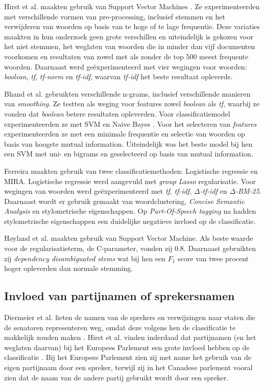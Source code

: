 Hirst et al. maakten  gebruik van Support Vector Machines \cite{Hirst_textto}. Ze experimenteerden met verschillende vormen van pre-processing, inclusief stemmen en het verwijderen van woorden op basis van te hoge of te lage frequentie. Deze variaties maakten in hun onderzoek geen grote verschillen en uiteindelijk is gekozen voor het niet stemmen, het weglaten van woorden die in minder dan vijf documenten voorkomen en resultaten van zowel met als zonder de top 500 meest frequente woorden. Daarnaast werd geëxperimenteerd met vier wegingen voor woorden: \textit{boolean}, \textit{tf}, \textit{tf-norm} en \textit{tf-idf}, waarvan \textit{tf-idf} het beste resultaat opleverde. \par

Bhand et al. gebruikten verschillende n-grams, inclusief verschillende manieren van \textit{smoothing}\cite{bhand}. Ze testten als weging voor features zowel \textit{boolean} als \textit{tf}, waarbij ze vonden dat \textit{boolean} betere resultaten opleverden. Voor classificatiemodel experimenteerden ze met SVM en Naive Bayes . Voor het selecteren van \textit{features} experimenteerden ze met een minimale frequentie en selectie van woorden op basis van hoogste mutual information. Uiteindelijk was het beste model bij hen een SVM met uni- en bigrams en geselecteerd op basis van mutual information.\par
Ferreira maakten gebruik van twee classificatiemethoden: Logistische regressie en MIRA\cite{Ferreira2016UsingTT}. Logistische regressie werd aangevuld met \textit{group Lasso} regularisatie. Voor wegingen van woorden werd geëxperimenteerd met \textit{tf}, \textit{tf-idf}, \textit{$\Delta$-tf-idf} en \textit{$\Delta$-BM-25}. Daarnaast wordt er gebruik gemaakt van woordclustering, \textit{Concise Semantic Analysis} en stylometrische eigenschappen. Op \textit{Part-Of-Speech tagging} na hadden stylometrische eigenschappen een duidelijke negatieve invloed op de classificatie.\par
Høyland et al. maakten gebruik van Support Vector Machine\cite{W14-2516}. Als beste waarde voor de regularisatieterm, de C-parameter, vonden zij 0.8. Daarnaast gebruikten zij \textit{dependency disambiguated
stems} wat bij hen een $F_1$ score van twee procent hoger opleverden dan normale stemming.\par

\subsection{Invloed van partijnamen of sprekersnamen}
Diermeier et al. lieten de namen van de sprekers en verwijzingen naar staten die de senatoren representeren weg, omdat deze volgens hen de classificatie te makkelijk zouden maken \cite{diermeier_godbout_yu_kaufmann_2012}. Hirst et al. vinden inderdaad dat partijnamen (en het weglaten daarvan) bij het Europees Parlement een grote invloed hebben op de classificatie \cite{Hirst_textto}. Bij het Europees Parlement zien zij met name het gebruik van de eigen partijnaam door een spreker, terwijl zij in het Canadese parlement vooral zien dat de naam van de andere partij gebruikt wordt door een spreker.

